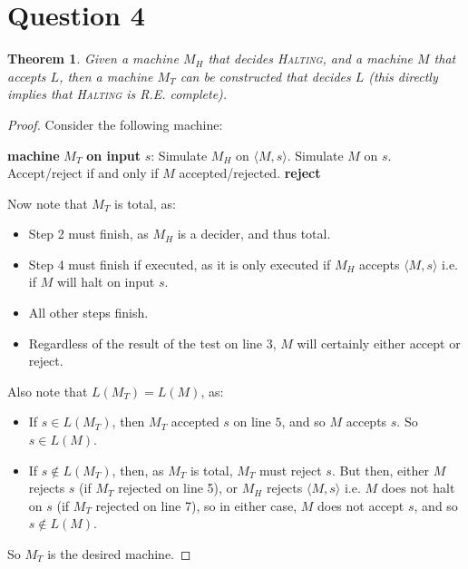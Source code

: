 \documentclass[a4paper,12pt]{scrartcl}
\newcommand{\Machine}[2]{\State \textbf{machine} #1 \textbf{on input} #2:}
\newcommand{\Reject}{\State \textbf{reject}}
\newcommand{\encode}[1]{\langle #1 \rangle}
\newtheorem{theorem}{Theorem}
\begin{document}
\section{Question 4}

\begin{theorem}
    Given a machine $M_H$ that decides \textsc{Halting}, and a machine $M$ that accepts $L$, then a machine $M_T$ can be constructed that decides $L$ (this directly implies that \textsc{Halting} is R.E. complete).
\end{theorem}
\begin{proof}
    Consider the following machine:
\begin{algorithmic}[1]
    \Machine{$M_T$}{$s$}
    \State Simulate $M_H$ on $\encode{M, s}$.
        \State Simulate $M$ on $s$.
        \State Accept/reject if and only if $M$ accepted/rejected.
    \Else
        \Reject
    \EndIf
\end{algorithmic}
    Now note that $M_T$ is total, as:
    \begin{itemize}
        \item Step 2 must finish, as $M_H$ is a decider, and thus total.
        \item Step 4 must finish if executed, as it is only executed if $M_H$ accepts $\langle M, s \rangle$ i.e. if $M$ will halt on input $s$.
        \item All other steps finish.
        \item Regardless of the result of the test on line 3, $M$ will certainly either accept or reject.
    \end{itemize}
    Also note that $L(M_T) = L(M)$, as:
\begin{itemize}
    \item If $s \in L(M_T)$, then $M_T$ accepted $s$ on line $5$, and so $M$ accepts $s$. So $s \in L(M)$.
    \item If $s \notin L(M_T)$, then, as $M_T$ is total, $M_T$ must reject $s$. But then, either $M$ rejects $s$ (if $M_T$ rejected on line 5), or $M_H$ rejects $\encode{M, s}$ i.e. $M$ does not halt on $s$ (if $M_T$ rejected on line 7), so in either case, $M$ does not accept $s$, and so $s \notin L(M)$.
\end{itemize}
    So $M_T$ is the desired machine.
\end{proof}
\end{document}
